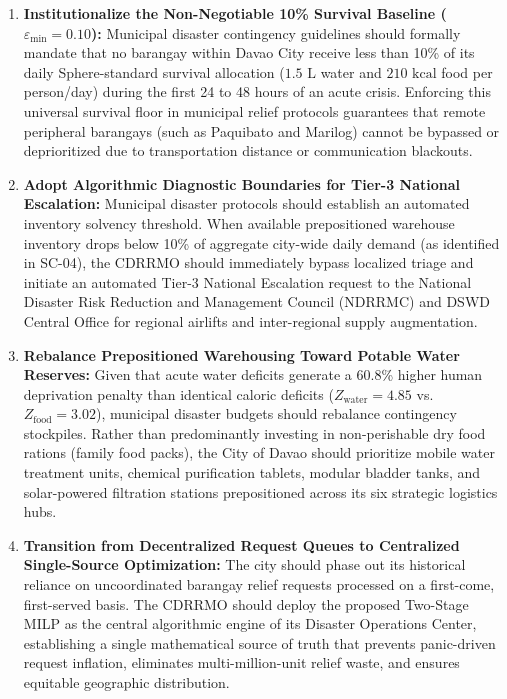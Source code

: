 \begin{enumerate}
    \item \textbf{Institutionalize the Non-Negotiable 10\% Survival Baseline ($\varepsilon_{\min} = 0.10$):}
    Municipal disaster contingency guidelines should formally mandate that no barangay within Davao City receive less than 10\% of its daily Sphere-standard survival allocation ($1.5\text{ L}$ water and $210\text{ kcal}$ food per person/day) during the first 24 to 48 hours of an acute crisis. Enforcing this universal survival floor in municipal relief protocols guarantees that remote peripheral barangays (such as Paquibato and Marilog) cannot be bypassed or deprioritized due to transportation distance or communication blackouts.

    \item \textbf{Adopt Algorithmic Diagnostic Boundaries for Tier-3 National Escalation:}
    Municipal disaster protocols should establish an automated inventory solvency threshold. When available prepositioned warehouse inventory drops below 10\% of aggregate city-wide daily demand (as identified in SC-04), the CDRRMO should immediately bypass localized triage and initiate an automated Tier-3 National Escalation request to the National Disaster Risk Reduction and Management Council (NDRRMC) and DSWD Central Office for regional airlifts and inter-regional supply augmentation.

    \item \textbf{Rebalance Prepositioned Warehousing Toward Potable Water Reserves:}
    Given that acute water deficits generate a 60.8\% higher human deprivation penalty than identical caloric deficits ($Z_{\text{water}} = 4.85$ vs. $Z_{\text{food}} = 3.02$), municipal disaster budgets should rebalance contingency stockpiles. Rather than predominantly investing in non-perishable dry food rations (family food packs), the City of Davao should prioritize mobile water treatment units, chemical purification tablets, modular bladder tanks, and solar-powered filtration stations prepositioned across its six strategic logistics hubs.

    \item \textbf{Transition from Decentralized Request Queues to Centralized Single-Source Optimization:}
    The city should phase out its historical reliance on uncoordinated barangay relief requests processed on a first-come, first-served basis. The CDRRMO should deploy the proposed Two-Stage MILP as the central algorithmic engine of its Disaster Operations Center, establishing a single mathematical source of truth that prevents panic-driven request inflation, eliminates multi-million-unit relief waste, and ensures equitable geographic distribution.


\end{enumerate}
